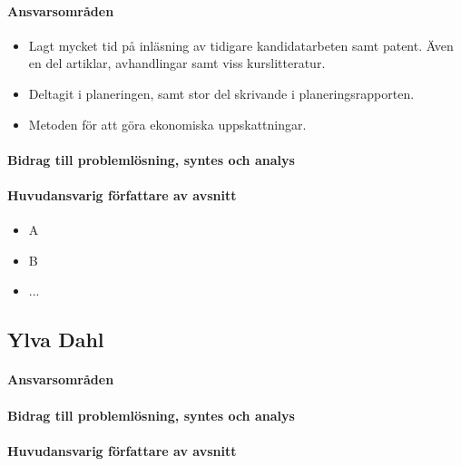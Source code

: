 \documentclass[12pt,a4paper]{article}
\begin{document}
\paragraph{Ansvarsområden}

\begin{itemize}
\item Lagt mycket tid på inläsning av tidigare kandidatarbeten samt patent. Även en del artiklar, avhandlingar samt viss kurslitteratur. 
\item Deltagit i planeringen, samt stor del skrivande i planeringsrapporten.
\item Metoden för att göra ekonomiska uppskattningar.
\end{itemize}


\paragraph{Bidrag till problemlösning, syntes och analys}

\paragraph{Huvudansvarig författare av avsnitt}



\begin{itemize}
\item A
\item B
\item ...
\end{itemize}




\subsection*{Ylva Dahl}

\paragraph{Ansvarsområden}

\paragraph{Bidrag till problemlösning, syntes och analys}

\paragraph{Huvudansvarig författare av avsnitt}
\end{document}
